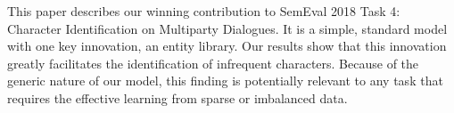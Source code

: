 This paper describes our winning contribution to SemEval 2018 Task 4: Character Identification on Multiparty Dialogues. It is a simple, standard model with one key innovation, an entity library. Our results show that this innovation greatly facilitates the identification of infrequent characters. Because of the generic nature of our model, this finding is potentially relevant to any task that requires the effective learning from sparse or imbalanced data.
